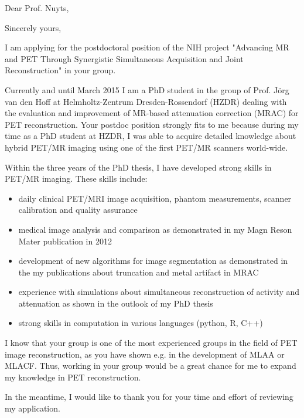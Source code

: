 \date{\today} %
\opening{Dear Prof. Nuyts,} %
\closing{Sincerely yours,} %

\makelettertitle %

\begin{minipage}{\textwidth} %
\setlength{\parskip}{0.2cm}%

I am applying for the postdoctoral position of the NIH project
"Advancing MR and PET Through Synergistic Simultaneous Acquisition and 
Joint Reconstruction" in your group.

Currently and until March 2015 I am a PhD student in the group of Prof. 
J\"org van den Hoff at Helmholtz-Zentrum Dresden-Rossendorf (HZDR) dealing with 
the evaluation and improvement of MR-based attenuation correction (MRAC) for 
PET reconstruction.
Your postdoc position strongly fits to me because during my time as a PhD 
student at HZDR, I was able to acquire detailed knowledge about hybrid PET/MR 
imaging using one of the first PET/MR scanners world-wide.

Within the three years of the PhD thesis, I have developed strong skills
in PET/MR imaging.
These skills include:

\begin{itemize}
  \item daily clinical PET/MRI image acquisition, phantom 
        measurements, scanner calibration and quality assurance
  \item medical image analysis and comparison as demonstrated in my
        Magn Reson Mater publication in 2012
  \item development of new algorithms for image segmentation as demonstrated
        in the my publications about truncation and metal artifact in MRAC
  \item experience with simulations about simultaneous reconstruction of
        activity and attenuation as shown in the outlook of my PhD thesis
  \item strong skills in computation in various languages (python, R, C++)
\end{itemize}

I know that your group is one of the most experienced groups in the field of
PET image reconstruction, as you have shown e.g. in the development of MLAA
or MLACF.
Thus, working in your group would be a great chance for me to expand my 
knowledge in PET reconstruction.

In the meantime, I would like to thank you for your time and effort of reviewing 
my application. 

\end{minipage}

\makeletterclosing %

\clearpage
